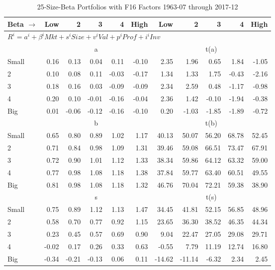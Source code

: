
\begin{table}[!ht]
\footnotesize
\centering
\caption{25-Size-Beta Portfolios with F16 Factors 1963-07 through 2017-12}
\begin{tabular}{lrrrrrrrrrr}
  \toprule
    
    Beta $\rightarrow$ & Low & 2 & 3 & 4 & High & Low & 2 & 3 & 4 & High  \\ 
  \midrule
  \multicolumn{11}{l}{$R^i=a^i+\beta^iMkt+s^iSize+v^iVal+p^iProf+i^iInv$}  \\
  
     & \multicolumn{5}{c}{a} & \multicolumn{5}{c}{t(a)}   \\
     \cmidrule(r){2-6} \cmidrule(r){7-11} 
    Small  & 0.16  & 0.13  & 0.04  & 0.11  & -0.10  & 2.35  & 1.96  & 0.65  & 1.84  & -1.05   \\
    2  & 0.10  & 0.08  & 0.11  & -0.03  & -0.17  & 1.34  & 1.33  & 1.75  & -0.43  & -2.16   \\
    3  & 0.18  & 0.16  & 0.03  & -0.09  & -0.09  & 2.34  & 2.59  & 0.48  & -1.17  & -0.98   \\
    4  & 0.20  & 0.10  & -0.01  & -0.16  & -0.04  & 2.36  & 1.42  & -0.10  & -1.94  & -0.38   \\
    Big  & 0.01  & -0.06  & -0.12  & -0.16  & -0.10  & 0.20  & -1.03  & -1.85  & -1.89  & -0.72   \\
    
  
     & \multicolumn{5}{c}{b} & \multicolumn{5}{c}{t(b)}   \\
     \cmidrule(r){2-6} \cmidrule(r){7-11} 
    Small  & 0.65  & 0.80  & 0.89  & 1.02  & 1.17  & 40.13  & 50.07  & 56.20  & 68.78  & 52.45   \\
    2  & 0.71  & 0.84  & 0.98  & 1.09  & 1.31  & 39.46  & 59.08  & 66.51  & 73.47  & 67.91   \\
    3  & 0.72  & 0.90  & 1.01  & 1.12  & 1.33  & 38.34  & 59.86  & 64.12  & 63.32  & 59.00   \\
    4  & 0.77  & 0.98  & 1.08  & 1.18  & 1.38  & 37.84  & 59.77  & 63.40  & 60.51  & 49.55   \\
    Big  & 0.81  & 0.98  & 1.08  & 1.18  & 1.32  & 46.76  & 70.04  & 72.21  & 59.38  & 38.90   \\
    
  
     & \multicolumn{5}{c}{s} & \multicolumn{5}{c}{t(s)}   \\
     \cmidrule(r){2-6} \cmidrule(r){7-11} 
    Small  & 0.75  & 0.89  & 1.12  & 1.13  & 1.47  & 34.45  & 41.81  & 52.15  & 56.85  & 48.96   \\
    2  & 0.58  & 0.70  & 0.77  & 0.92  & 1.15  & 23.65  & 36.30  & 38.52  & 46.35  & 44.34   \\
    3  & 0.23  & 0.45  & 0.57  & 0.69  & 0.90  & 9.04  & 22.47  & 27.05  & 29.08  & 29.71   \\
    4  & -0.02  & 0.17  & 0.26  & 0.33  & 0.63  & -0.55  & 7.79  & 11.19  & 12.74  & 16.80   \\
    Big  & -0.34  & -0.21  & -0.13  & 0.06  & 0.11  & -14.62  & -11.14  & -6.32  & 2.34  & 2.45   \\
    

\end{tabular}
\end{table}
